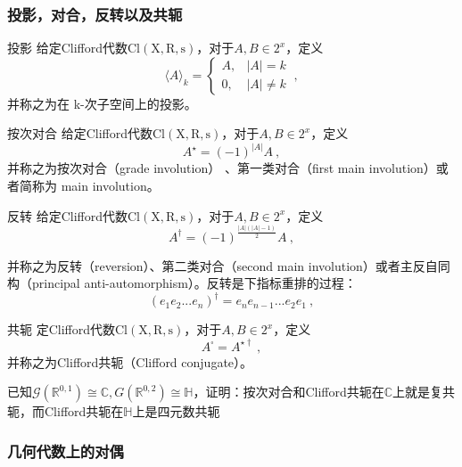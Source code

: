 \subsubsection{投影，对合，反转以及共轭}
\begin{definition}{投影}
给定Clifford代数$\mathrm {Cl(X,R,s)}$，对于$A,B\in 2^x$，定义
\begin{equation}
\langle A\rangle_k=\left\{\begin{array}{cc}
A, & |A|=k \\
0, & |A| \neq k
\end{array}\right.~,
\end{equation}
并称之为在 k-次子空间上的投影。
\end{definition}
\begin{definition}{按次对合}
给定Clifford代数$\mathrm {Cl(X,R,s)}$，对于$A,B\in 2^x$，定义
\begin{equation}
A^{\star}=(-1)^{|A|}A~,
\end{equation}
并称之为按次对合（grade involution） 、第一类对合（first main
involution）或者简称为 main involution。
\end{definition}
\begin{definition}{反转}
给定Clifford代数$\mathrm {Cl(X,R,s)}$，对于$A,B\in 2^x$，定义
\begin{equation}
A^{\dagger}=(-1)^{\frac{|A|(|A|-1)}{2}}A~,
\end{equation}
\end{definition}
并称之为反转（reversion）、第二类对合（second main involution）或者主反自同构（principal anti-automorphism）。反转是下指标重排的过程：
$$(e_1e_2...e_n)^{\dagger}=e_ne_{n-1}...e_2e_1~,$$
\begin{definition}{共轭}
定Clifford代数$\mathrm {Cl(X,R,s)}$，对于$A,B\in 2^x$，定义
\begin{equation}
A^{\square}=A^{\star \dagger}~,
\end{equation}
并称之为Clifford共轭（Clifford conjugate）。
\end{definition}
\begin{exercise}{}
已知$\mathcal G(\mathbb R^{0,1})\cong \mathbb C,G(\mathbb R^{0,2})\cong \mathbb H$，证明：按次对合和Clifford共轭在$\mathbb C$上就是复共轭，而Clifford共轭在$\mathbb H$上是四元数共轭
\end{exercise}
\subsubsection{几何代数上的对偶}
